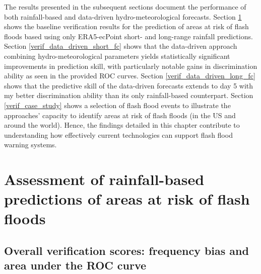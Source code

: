 The results presented in the subsequent sections document the performance of both rainfall-based and data-driven hydro-meteorological forecasts. Section \ref{verif_rainfall_based_fc} shows the baseline verification results for the prediction of areas at risk of flash floods based using only ERA5-ecPoint short- and long-range rainfall predictions. Section \ref{verif_data_driven_short_fc} shows that the data-driven approach combining hydro-meteorological parameters yields statistically significant improvements in prediction skill, with particularly notable gains in discrimination ability as seen in the provided ROC curves. Section \ref{verif_data_driven_long_fc} shows that the predictive skill of the data-driven forecasts extends to day 5 with my better discrimination ability than its only rainfall-based counterpart. Section \ref{verif_case_study} shows a selection of flash flood events to illustrate the approaches' capacity to identify areas at risk of flash floods (in the US and around the world). Hence, the findings detailed in this chapter contribute to understanding how effectively current technologies can support flash flood warning systems.



\section{Assessment of rainfall-based predictions of areas at risk of flash floods}
\label{verif_rainfall_based_fc}

\subsection{Overall verification scores: frequency bias and area under the ROC curve}

